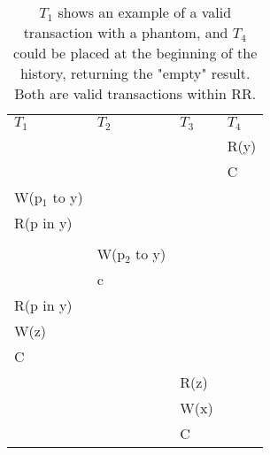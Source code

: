 \begin{table}[h]
    \begin{tabular}{l|l|l|l}
        $T_1$            & $T_2$            & $T_3$   & $T_4$   \\
        &               &      & R(y) \\
        &               &      & C    \\
        W(p$_1$ to y) &               &      &      \\
        R(p in y)     &               &      &      \\
        &               &      &      \\
        & W(p$_2$ to y) &      &      \\
        & c             &      &      \\
        R(p in y)     &               &      &      \\
        W(z)          &               &      &      \\
        C             &               &      &      \\
        &               & R(z) &      \\
        &               & W(x) &      \\
        &               & C    &
    \end{tabular}
    \caption{$T_1$ shows an example of a valid transaction with a phantom, and $T_4$ could be placed at the beginning of the history, returning the "empty" result. Both are valid transactions within RR.}
\end{table}